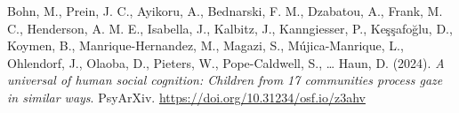 \documentclass[
  man,floatsintext]{apa7}
\newlength{\cslhangindent}
\newenvironment{CSLReferences}[2] %
 {\begin{list}{}{%
  \setlength{\itemindent}{0pt}
  \setlength{\leftmargin}{0pt}
  \setlength{\parsep}{0pt}
  \ifodd #1
   \setlength{\leftmargin}{\cslhangindent}
   \setlength{\itemindent}{-1\cslhangindent}
  \fi
  \setlength{\itemsep}{#2\baselineskip}}}
 {\end{list}}
\begin{document}
\label{refs}
\begin{CSLReferences}{1}{0}
Bohn, M., Prein, J. C., Ayikoru, A., Bednarski, F. M., Dzabatou, A., Frank, M. C., Henderson, A. M. E., Isabella, J., Kalbitz, J., Kanngiesser, P., Keşşafoğlu, D., Koymen, B., Manrique-Hernandez, M., Magazi, S., Mújica-Manrique, L., Ohlendorf, J., Olaoba, D., Pieters, W., Pope-Caldwell, S., \ldots{} Haun, D. (2024). \emph{A universal of human social cognition: {Children} from 17 communities process gaze in similar ways}. PsyArXiv. \url{https://doi.org/10.31234/osf.io/z3ahv}

\end{CSLReferences}

\endgroup
\end{document}

